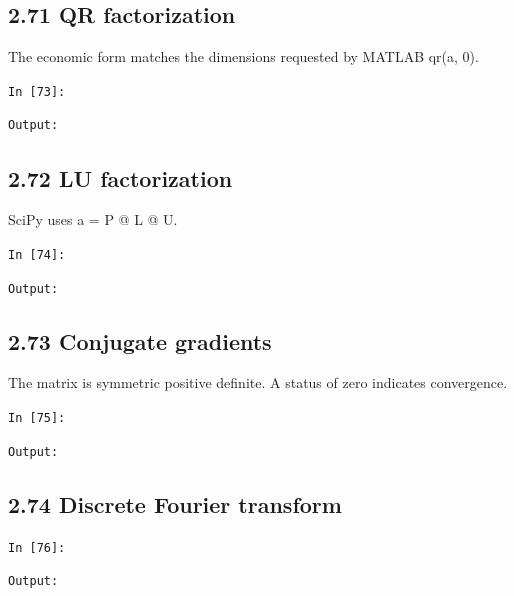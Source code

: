 \documentclass[11pt]{article}
\begin{document}
\par\medskip\noindent\begin{minipage}{\linewidth}
\subsection*{2.71 QR factorization}
The economic form matches the dimensions requested by MATLAB qr(a, 0).

\noindent\texttt{In [73]:}

\noindent\texttt{Output:}

\end{minipage}\par

\par\medskip\noindent\begin{minipage}{\linewidth}
\subsection*{2.72 LU factorization}
SciPy uses a = P @ L @ U.

\noindent\texttt{In [74]:}

\noindent\texttt{Output:}

\end{minipage}\par

\par\medskip\noindent\begin{minipage}{\linewidth}
\subsection*{2.73 Conjugate gradients}
The matrix is symmetric positive definite. A status of zero indicates convergence.

\noindent\texttt{In [75]:}

\noindent\texttt{Output:}

\end{minipage}\par

\par\medskip\noindent\begin{minipage}{\linewidth}
\subsection*{2.74 Discrete Fourier transform}
\noindent\texttt{In [76]:}

\noindent\texttt{Output:}

\end{minipage}\par
\end{document}
